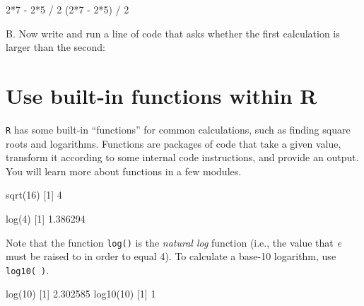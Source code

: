 \documentclass[
]{book}
\newenvironment{Shaded}{\begin{snugshade}}{\end{snugshade}}
\newcommand{\DecValTok}[1]{\textcolor[rgb]{0.00,0.00,0.81}{#1}}
\newcommand{\FloatTok}[1]{\textcolor[rgb]{0.00,0.00,0.81}{#1}}
\newcommand{\FunctionTok}[1]{\textcolor[rgb]{0.00,0.00,0.00}{#1}}
\newcommand{\NormalTok}[1]{#1}
\newcommand{\SpecialCharTok}[1]{\textcolor[rgb]{0.00,0.00,0.00}{#1}}
\begin{document}
\begin{Shaded}
\begin{Highlighting}[]
\DecValTok{2}\SpecialCharTok{*}\DecValTok{7} \SpecialCharTok{{-}} \DecValTok{2}\SpecialCharTok{*}\DecValTok{5} \SpecialCharTok{/} \DecValTok{2}
\NormalTok{(}\DecValTok{2}\SpecialCharTok{*}\DecValTok{7} \SpecialCharTok{{-}} \DecValTok{2}\SpecialCharTok{*}\DecValTok{5}\NormalTok{) }\SpecialCharTok{/} \DecValTok{2}
\end{Highlighting}
\end{Shaded}

B. Now write and run a line of code that asks whether the first calculation is larger than the second:

\hypertarget{use-built-in-functions-within-r}{%
\section*{Use built-in functions within R}\label{use-built-in-functions-within-r}}

\texttt{R} has some built-in ``functions'' for common calculations, such as finding square roots and logarithms. Functions are packages of code that take a given value, transform it according to some internal code instructions, and provide an output. You will learn more about functions in a few modules.

\begin{Shaded}
\begin{Highlighting}[]
\FunctionTok{sqrt}\NormalTok{(}\DecValTok{16}\NormalTok{)}
\NormalTok{[}\DecValTok{1}\NormalTok{] }\DecValTok{4}

\FunctionTok{log}\NormalTok{(}\DecValTok{4}\NormalTok{)}
\NormalTok{[}\DecValTok{1}\NormalTok{] }\FloatTok{1.386294}
\end{Highlighting}
\end{Shaded}

Note that the function \texttt{log()} is the \emph{natural log} function (i.e., the value that \emph{e} must be raised to in order to equal 4). To calculate a base-10 logarithm, use \texttt{log10(\ )}.

\begin{Shaded}
\begin{Highlighting}[]
\FunctionTok{log}\NormalTok{(}\DecValTok{10}\NormalTok{)}
\NormalTok{[}\DecValTok{1}\NormalTok{] }\FloatTok{2.302585}
\FunctionTok{log10}\NormalTok{(}\DecValTok{10}\NormalTok{)}
\NormalTok{[}\DecValTok{1}\NormalTok{] }\DecValTok{1}
\end{Highlighting}
\end{Shaded}
\end{document}
